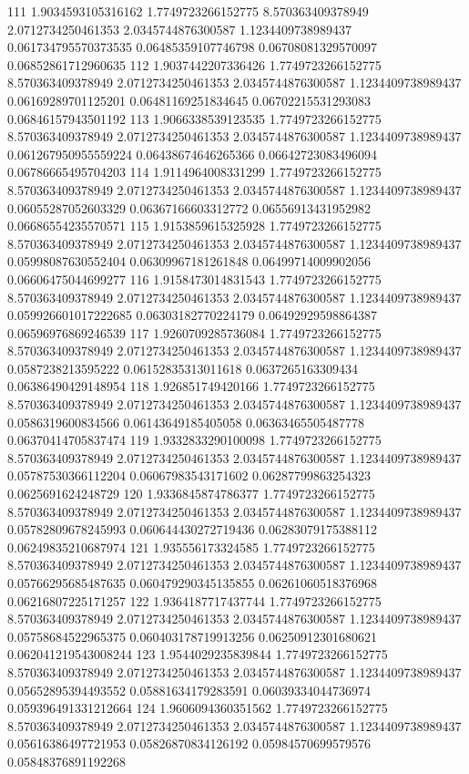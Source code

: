 {111 1.9034593105316162 1.7749723266152775 8.570363409378949 2.0712734250461353 2.0345744876300587 1.1234409738989437 0.061734795570373535 0.06485359107746798 0.06708081329570097 0.06852861712960635
112 1.9037442207336426 1.7749723266152775 8.570363409378949 2.0712734250461353 2.0345744876300587 1.1234409738989437 0.06169289701125201 0.06481169251834645 0.06702215531293083 0.06846157943501192
113 1.9066338539123535 1.7749723266152775 8.570363409378949 2.0712734250461353 2.0345744876300587 1.1234409738989437 0.061267950955559224 0.06438674646265366 0.06642723083496094 0.06786665495704203
114 1.9114964008331299 1.7749723266152775 8.570363409378949 2.0712734250461353 2.0345744876300587 1.1234409738989437 0.06055287052603329 0.06367166603312772 0.06556913431952982 0.06686554235570571
115 1.9153859615325928 1.7749723266152775 8.570363409378949 2.0712734250461353 2.0345744876300587 1.1234409738989437 0.05998087630552404 0.06309967181261848 0.06499714009902056 0.06606475044699277
116 1.9158473014831543 1.7749723266152775 8.570363409378949 2.0712734250461353 2.0345744876300587 1.1234409738989437 0.059926601017222685 0.06303182770224179 0.06492929598864387 0.06596976869246539
117 1.9260709285736084 1.7749723266152775 8.570363409378949 2.0712734250461353 2.0345744876300587 1.1234409738989437 0.0587238213595222 0.06152835313011618 0.0637265163309434 0.06386490429148954
118 1.926851749420166 1.7749723266152775 8.570363409378949 2.0712734250461353 2.0345744876300587 1.1234409738989437 0.0586319600834566 0.06143649185405058 0.06363465505487778 0.06370414705837474
119 1.9332833290100098 1.7749723266152775 8.570363409378949 2.0712734250461353 2.0345744876300587 1.1234409738989437 0.05787530366112204 0.06067983543171602 0.06287799863254323 0.0625691624248729
120 1.9336845874786377 1.7749723266152775 8.570363409378949 2.0712734250461353 2.0345744876300587 1.1234409738989437 0.05782809678245993 0.060644430272719436 0.06283079175388112 0.06249835210687974
121 1.935556173324585 1.7749723266152775 8.570363409378949 2.0712734250461353 2.0345744876300587 1.1234409738989437 0.05766295685487635 0.060479290345135855 0.06261060518376968 0.06216807225171257
122 1.9364187717437744 1.7749723266152775 8.570363409378949 2.0712734250461353 2.0345744876300587 1.1234409738989437 0.05758684522965375 0.060403178719913256 0.06250912301680621 0.062041219543008244
123 1.9544029235839844 1.7749723266152775 8.570363409378949 2.0712734250461353 2.0345744876300587 1.1234409738989437 0.05652895394493552 0.05881634179283591 0.06039334044736974 0.059396491331212664
124 1.9606094360351562 1.7749723266152775 8.570363409378949 2.0712734250461353 2.0345744876300587 1.1234409738989437 0.05616386497721953 0.05826870834126192 0.05984570699579576 0.05848376891192268
}
